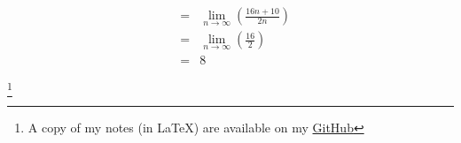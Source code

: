 \documentclass{article}
\newcommand\blfootnote[1]{
    \begingroup
    \renewcommand\thefootnote{}\footnote{#1}
    \addtocounter{footnote}{-1}
    \endgroup
}
\begin{document}
\begin{enumerate}
\begin{eqnarray}
                                                                                                                        &=& \lim_{n \to \infty}{\left(\frac{16n + 10}{2n}\right)} \\
                                                                                                                        &=& \lim_{n \to \infty}{\left(\frac{16}{2}\right)} \\
                                                                                                                        &=& 8
        \end{eqnarray}
\end{enumerate}

\blfootnote{A copy of my notes (in \LaTeX) are available on my \href{https://github.com/onlinechronically/MATH-211}{GitHub}}
\end{document}

